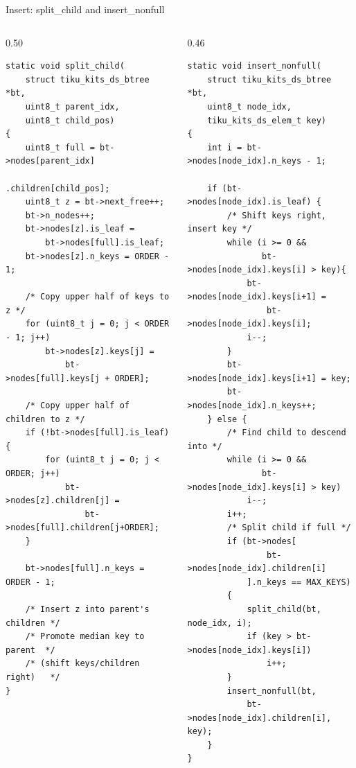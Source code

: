 \documentclass[aspectratio=169, 10pt]{beamer}
\begin{document}
\begin{frame}[fragile]{Insert: split\_child and insert\_nonfull}
\begin{columns}[T]
\begin{column}{0.50\textwidth}
\begin{lstlisting}[style=cstyle, basicstyle=\ttfamily\tiny,
  title={split\_child: split a full child node}]
static void split_child(
    struct tiku_kits_ds_btree *bt,
    uint8_t parent_idx,
    uint8_t child_pos)
{
    uint8_t full = bt->nodes[parent_idx]
                       .children[child_pos];
    uint8_t z = bt->next_free++;
    bt->n_nodes++;
    bt->nodes[z].is_leaf =
        bt->nodes[full].is_leaf;
    bt->nodes[z].n_keys = ORDER - 1;

    /* Copy upper half of keys to z */
    for (uint8_t j = 0; j < ORDER - 1; j++)
        bt->nodes[z].keys[j] =
            bt->nodes[full].keys[j + ORDER];

    /* Copy upper half of children to z */
    if (!bt->nodes[full].is_leaf) {
        for (uint8_t j = 0; j < ORDER; j++)
            bt->nodes[z].children[j] =
                bt->nodes[full].children[j+ORDER];
    }

    bt->nodes[full].n_keys = ORDER - 1;

    /* Insert z into parent's children */
    /* Promote median key to parent  */
    /* (shift keys/children right)   */
}
\end{lstlisting}
\end{column}

\begin{column}{0.46\textwidth}
\begin{lstlisting}[style=cstyle, basicstyle=\ttfamily\tiny,
  title={insert\_nonfull: insert into non-full node}]
static void insert_nonfull(
    struct tiku_kits_ds_btree *bt,
    uint8_t node_idx,
    tiku_kits_ds_elem_t key)
{
    int i = bt->nodes[node_idx].n_keys - 1;

    if (bt->nodes[node_idx].is_leaf) {
        /* Shift keys right, insert key */
        while (i >= 0 &&
               bt->nodes[node_idx].keys[i] > key){
            bt->nodes[node_idx].keys[i+1] =
                bt->nodes[node_idx].keys[i];
            i--;
        }
        bt->nodes[node_idx].keys[i+1] = key;
        bt->nodes[node_idx].n_keys++;
    } else {
        /* Find child to descend into */
        while (i >= 0 &&
               bt->nodes[node_idx].keys[i] > key)
            i--;
        i++;
        /* Split child if full */
        if (bt->nodes[
                bt->nodes[node_idx].children[i]
            ].n_keys == MAX_KEYS)
        {
            split_child(bt, node_idx, i);
            if (key > bt->nodes[node_idx].keys[i])
                i++;
        }
        insert_nonfull(bt,
            bt->nodes[node_idx].children[i], key);
    }
}
\end{lstlisting}
\end{column}
\end{columns}
\end{frame}
\end{document}
